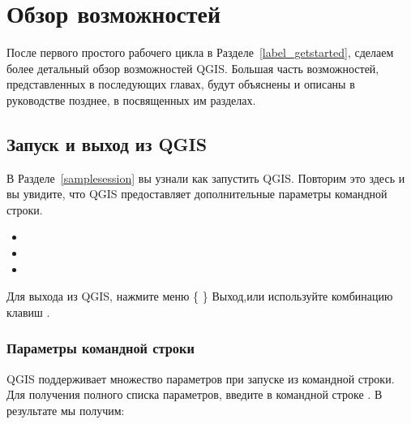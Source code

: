 
\chapter{Обзор возможностей}\label{feature_glance}


После первого простого рабочего цикла в Разделе~\ref{label_getstarted},
сделаем более детальный обзор возможностей QGIS. Большая часть
возможностей, представленных в последующих главах, будут объяснены и
описаны в руководстве позднее, в посвященных им разделах.

\section{Запуск и выход из QGIS}\label{label_startinqgis}

В Разделе~\ref{samplesession} вы узнали как запустить QGIS. Повторим это
здесь и вы увидите, что QGIS предоставляет дополнительные параметры
командной строки.

\begin{itemize}
\item {}
\item {}
\item {}
\end{itemize}

Для выхода из QGIS, нажмите меню \{\nix{} \} \arrow
Выход,или используйте комбинацию клавиш .

\subsection{Параметры командной строки}
\label{label_commandline}

\nix QGIS поддерживает множество параметров при запуске из командной строки.
Для получения полного списка параметров, введите в командной строке
. В результате мы получим:

